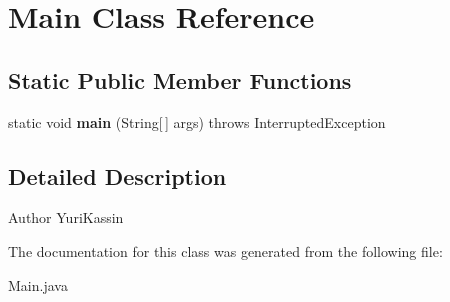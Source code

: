 \section{Main Class Reference}
\label{class_main}
\subsection*{Static Public Member Functions}
\begin{DoxyCompactItemize}
\item 
\mbox{\label{class_main_a8a5d0f827edddff706cc0e6740d0579a}} 
static void {\bfseries main} (String[$\,$] args)  throws Interrupted\+Exception
\end{DoxyCompactItemize}


\subsection{Detailed Description}
\begin{DoxyAuthor}{Author}
Yuri\+Kassin 
\end{DoxyAuthor}


The documentation for this class was generated from the following file\+:\begin{DoxyCompactItemize}
\item 
Main.\+java\end{DoxyCompactItemize}
